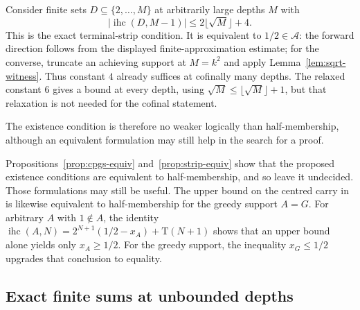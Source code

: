 \begin{prop}
\label{prop:strip-equiv}
Consider finite sets $D\subseteq\{2,\ldots,M\}$ at arbitrarily large
depths $M$ with
\[
 |\operatorname{ihc}(D,M-1)|\le2\lfloor\sqrt M\rfloor+4.
\]
This is the exact terminal-strip condition.
It is equivalent to $1/2\in\mathcal A$: the forward direction follows
from the displayed finite-approximation estimate; for the converse,
truncate an achieving support at $M=k^2$ and apply
Lemma~\ref{lem:sqrt-witness}.  Thus constant $4$ already suffices at
cofinally many depths.  The relaxed constant $6$ gives a bound at every
depth, using $\sqrt M\le\lfloor\sqrt M\rfloor+1$, but that relaxation is
not needed for the cofinal statement.
\end{prop}
The existence condition is therefore no weaker logically than half-membership,
although an equivalent formulation may still help in the search for a proof.

\begin{obs}
Propositions~\ref{prop:cpgs-equiv} and~\ref{prop:strip-equiv} show that the
proposed existence conditions are equivalent to half-membership, and so leave
it undecided.  Those formulations may still be useful.  The
upper bound on the centred carry in
is likewise equivalent to half-membership for the greedy support $A=G$.  For arbitrary
$A$ with $1\notin A$, the identity
$\operatorname{ihc}(A,N)=2^{N+1}(1/2-x_A)+\mathrm T(N+1)$ shows that an
upper bound alone yields only $x_A\ge1/2$.
For the greedy support, the inequality $x_G\le1/2$ upgrades that conclusion to
equality.
\end{obs}

\subsection{Exact finite sums at unbounded depths}

